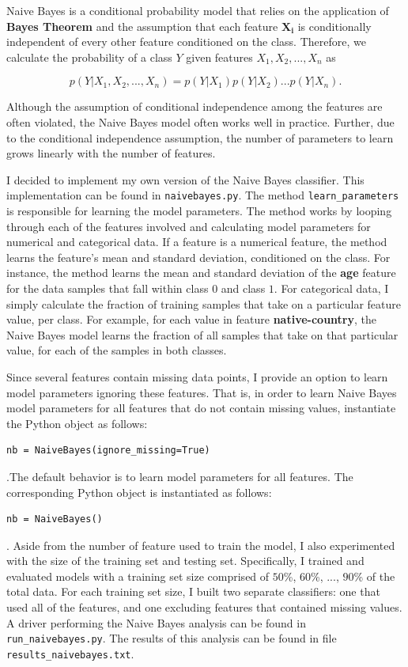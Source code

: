 \documentclass[11pt, oneside]{article}   	%
\begin{document}
Naive Bayes is a conditional probability model that relies on the application of \textbf{Bayes Theorem} and the assumption that each feature $ \mathbf{X_i} $ is conditionally independent of every other feature conditioned on the class. Therefore, we calculate the probability of a class $ Y $ given features $ X_1, X_2, ..., X_n $ as 

\[ p(Y| X_1, X_2, ..., X_n) = p(Y|X_1) p(Y|X_2)...p(Y|X_n). \]

Although the assumption of conditional independence among the features are often violated, the Naive Bayes model often works well in practice. Further, due to the conditional independence assumption, the number of parameters to learn grows linearly with the number of features. 

I decided to implement my own version of the Naive Bayes classifier. This implementation can be found in \texttt{naivebayes.py}. The method \texttt{learn\_parameters} is responsible for learning the model parameters. The method works by looping through each of the features involved and calculating model parameters for numerical and categorical data. If a feature is a numerical feature, the method learns the feature's mean and standard deviation, conditioned on the class. For instance, the method learns the mean and standard deviation of the \textbf{age} feature for the data samples that fall within class $ 0 $ and class $ 1 $. For categorical data, I simply calculate the fraction of training samples that take on a particular feature value, per class. For example, for each value in feature \textbf{native-country}, the Naive Bayes model learns the fraction of all samples that take on that particular value, for each of the samples in both classes.

Since several features contain missing data points, I provide an option to learn model parameters ignoring these features. That is, in order to learn Naive Bayes model parameters for all features that do not contain missing values, instantiate the Python object as follows:

\begin{verbatim}
nb = NaiveBayes(ignore_missing=True)
\end{verbatim}
.The default behavior is to learn model parameters for all features. The corresponding Python object is instantiated as follows:

\begin{verbatim}
nb = NaiveBayes()
\end{verbatim}
. Aside from the number of feature used to train the model, I also experimented with the size of the training set and testing set. Specifically, I trained and evaluated models with a training set size comprised of $50$\%, $60$\%, $...$, $90$\% of the total data. For each training set size, I built two separate classifiers: one that used all of the features, and one excluding features that contained missing values. A driver performing the Naive Bayes analysis can be found in \texttt{run\_naivebayes.py}. The results of this analysis can be found in file \texttt{results\_naivebayes.txt}.
\end{document}
